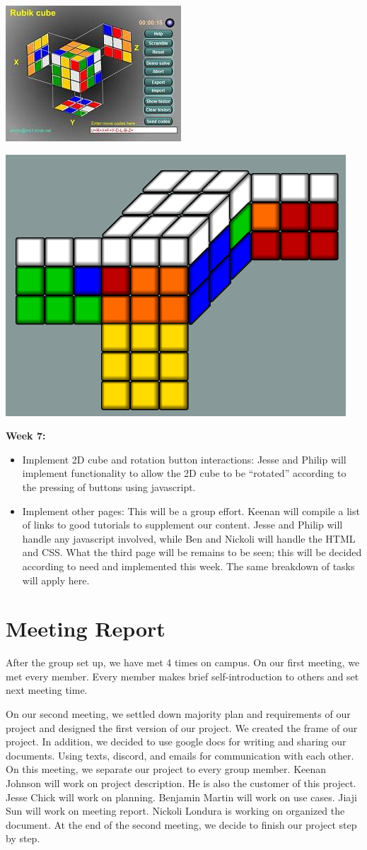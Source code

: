 \documentclass[12pt]{article}
\begin{document}
\par
  \includegraphics[width = .4\textwidth]{rubiks1.PNG}

  \includegraphics[width = .4\textwidth]{rubiks2.PNG}


\textbf{Week 7:}
\begin{itemize}
\item Implement 2D cube and rotation button interactions: Jesse and Philip will implement functionality to allow the 2D cube to be “rotated” according to the pressing of buttons using javascript.
\item Implement other pages: This will be a group effort. Keenan will compile a list of links to good tutorials to supplement our content. Jesse and Philip will handle any javascript involved, while Ben and Nickoli will handle the HTML and CSS. What the third page will be remains to be seen; this will be decided according to need and implemented this week. The same breakdown of tasks will apply here.
\end{itemize}






\section{Meeting Report}
\par
After the group set up, we have met 4 times on campus.  On our first meeting, we met every member. Every member makes brief self-introduction to others and set next meeting time. \\

\par
On our second meeting, we settled down majority plan and requirements of our project and designed the first version of our project. We created the frame of our project. In addition, we decided to use google docs for writing and sharing our documents. Using texts, discord, and emails for communication with each other. On this meeting, we separate our project to every group member. Keenan Johnson will work on project description. He is also the customer of this project. Jesse Chick will work on planning. Benjamin Martin will work on use cases. Jiaji Sun will work on meeting report. Nickoli Londura is working on organized the document. At the end of the second meeting, we decide to finish our project step by step. \\
\end{document}
